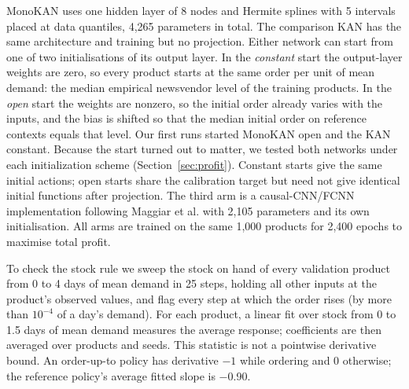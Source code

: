 \documentclass[conference]{IEEEtran}
\begin{document}
MonoKAN uses one hidden layer of 8 nodes and Hermite splines with 5 intervals placed at data quantiles,
4,265 parameters in total. The comparison KAN has the same architecture and training but no
projection. Either network can start from one of two initialisations of its output layer. In the \emph{constant}
start the output-layer weights are zero, so every product starts at the same order per unit of mean demand: the
median empirical newsvendor level of the training products. In the \emph{open} start the weights are nonzero, so the
initial order already varies with the inputs, and the bias is shifted so that the median initial order on reference
contexts equals that level. Our first runs started MonoKAN open and the KAN constant. Because the start turned out to
matter, we tested both networks under each initialization scheme (Section~\ref{sec:profit}). Constant starts give
the same initial actions; open starts share the calibration target but need not give identical initial functions
after projection. The third arm is a causal-CNN/FCNN implementation following Maggiar et al. with
2,105 parameters and its own initialisation. All arms are trained on the same 1,000 products for
2,400 epochs to maximise total profit.

To check the stock rule we sweep the stock on hand of every validation product from 0 to 4 days of mean demand in 25
steps, holding all other inputs at the product's observed values, and flag every step at which the order rises (by
more than $10^{-4}$ of a day's demand). For each product, a linear fit over stock from 0 to 1.5 days of mean demand
measures the average response; coefficients are then averaged over products and seeds. This statistic is not a
pointwise derivative bound. An order-up-to policy has derivative $-1$ while ordering and 0 otherwise; the reference
policy's average fitted slope is $-$0.90.
\end{document}
